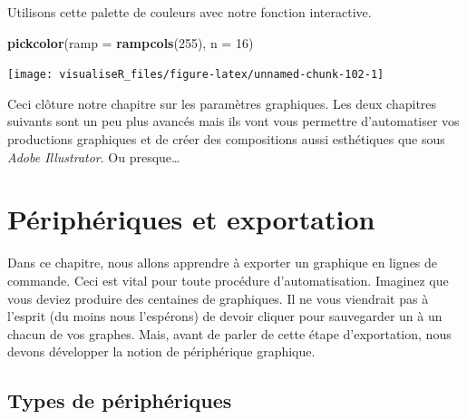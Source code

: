 \documentclass[]{article}
\newenvironment{Shaded}{\begin{snugshade}}{\end{snugshade}}
\newcommand{\DataTypeTok}[1]{\textcolor[rgb]{0.13,0.29,0.53}{#1}}
\newcommand{\DecValTok}[1]{\textcolor[rgb]{0.00,0.00,0.81}{#1}}
\newcommand{\KeywordTok}[1]{\textcolor[rgb]{0.13,0.29,0.53}{\textbf{#1}}}
\newcommand{\NormalTok}[1]{#1}
\begin{document}
Utilisons cette palette de couleurs avec notre fonction interactive.

\begin{Shaded}
\begin{Highlighting}[]
\KeywordTok{pickcolor}\NormalTok{(}\DataTypeTok{ramp =} \KeywordTok{rampcols}\NormalTok{(}\DecValTok{255}\NormalTok{), }\DataTypeTok{n =} \DecValTok{16}\NormalTok{)}
\end{Highlighting}
\end{Shaded}

\begin{center}\texttt{[image: visualiseR\_files/figure-latex/unnamed-chunk-102-1]} \end{center}

Ceci clôture notre chapitre sur les paramètres graphiques. Les deux chapitres suivants sont un peu plus avancés mais ils vont vous permettre d'automatiser vos productions graphiques et de créer des compositions aussi esthétiques que sous \emph{Adobe Illustrator}. Ou presque\ldots{}

\hypertarget{puxe9riphuxe9riques-et-exportation}{%
\section{Périphériques et exportation}\label{puxe9riphuxe9riques-et-exportation}}

Dans ce chapitre, nous allons apprendre à exporter un graphique en lignes de commande. Ceci est vital pour toute procédure d'automatisation. Imaginez que vous deviez produire des centaines de graphiques. Il ne vous viendrait pas à l'esprit (du moins nous l'espérons) de devoir cliquer pour sauvegarder un à un chacun de vos graphes. Mais, avant de parler de cette étape d'exportation, nous devons développer la notion de périphérique graphique.

\hypertarget{types-de-puxe9riphuxe9riques}{%
\subsection{Types de périphériques}\label{types-de-puxe9riphuxe9riques}}
\end{document}
